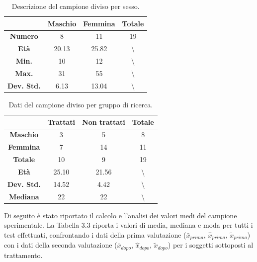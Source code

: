 \begin{table}[H]
\begin{center}
\begin{tabular}{|c|c|c|c|} \hline
{\textbf{}} & {\textbf{Maschio}} & {\textbf{Femmina}}& {\textbf{Totale}}\\ \hline
\textbf{Numero} & 8 & 11 & 19 \\ 
\textbf{Età} & 20.13 & 25.82 & \textbackslash \\ 
\textbf{Min.} & 10 & 12 & \textbackslash \\ 
\textbf{Max.} & 31 & 55 & \textbackslash \\ 
\textbf{Dev. Std.} & 6.13 & 13.04 & \textbackslash \\
\hline
\end{tabular}
\end{center}
\caption{Descrizione del campione diviso per sesso.}
\end{table}
\begin{table}[H]
\begin{center}
\begin{tabular}{|c|c|c|c|} \hline
{\textbf{}} & {\textbf{Trattati}} & {\textbf{Non trattati}}& {\textbf{Totale}}\\ \hline
\textbf{Maschio} & 3 & 5 & 8 \\
\textbf{Femmina} & 7 & 14 & 11\\ 
\textbf{Totale} & 10 & 9 & 19 \\ 
\textbf{Età} & 25.10 & 21.56 & \textbackslash \\ 
\textbf{Dev. Std.} & 14.52 & 4.42 & \textbackslash \\
\textbf{Mediana} & 22 & 22 & \textbackslash \\
\hline
\end{tabular}
\end{center}
\caption{Dati del campione diviso per gruppo di ricerca.}
\end{table}

Di seguito è stato riportato il calcolo e l’analisi dei valori medi del campione sperimentale.
La Tabella 3.3 riporta i valori di media, mediana e moda per tutti i test effettuati, confrontando i dati della prima valutazione ($\bar{x}_{prima}$, $\hat{x}_{prima}$, $\tilde{x}_{prima}$) con i dati della seconda valutazione ($\bar{x}_{dopo}$, $\hat{x}_{dopo}$, $\tilde{x}_{dopo}$) per i soggetti sottoposti al trattamento.

